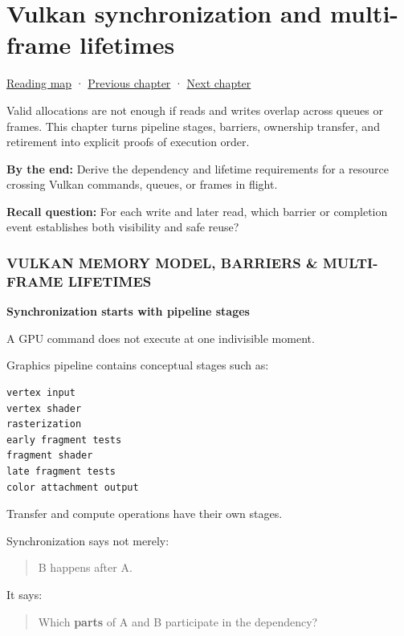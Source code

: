 \hypertarget{05-engine-i-ch022}{}
\chapter{Vulkan synchronization and multi-frame lifetimes}\label{stagechapter:05-engine-i-ch022}\label{05-engine-i-ch022-vulkan-synchronization-and-multi-frame-lifetimes}

\hyperref[volume-reading-map]{Reading map} · \hyperref[05-engine-i-ch021-buffers-images-memory-and-uploads]{Previous chapter} · \hyperref[05-engine-i-ch023-execute-and-measure-a-metal-frame]{Next chapter}

Valid allocations are not enough if reads and writes overlap across queues or frames. This chapter turns pipeline stages, barriers, ownership transfer, and retirement into explicit proofs of execution order.

\textbf{By the end:} Derive the dependency and lifetime requirements for a resource crossing Vulkan commands, queues, or frames in flight.

\textbf{Recall question:} For each write and later read, which barrier or completion event establishes both visibility and safe reuse?

\subsection{VULKAN MEMORY MODEL, BARRIERS \& MULTI-FRAME LIFETIMES}\label{05-engine-i-ch022-vulkan-memory-model-barriers-multi-frame-lifetimes}

\textbf{Synchronization starts with pipeline stages}

A GPU command does not execute at one indivisible moment.

Graphics pipeline contains conceptual stages such as:

\begin{verbatim}
vertex input
vertex shader
rasterization
early fragment tests
fragment shader
late fragment tests
color attachment output
\end{verbatim}

Transfer and compute operations have their own stages.

Synchronization says not merely:

\begin{quote}
B happens after A.
\end{quote}

It says:

\begin{quote}
Which \textbf{parts} of A and B participate in the dependency?
\end{quote}

